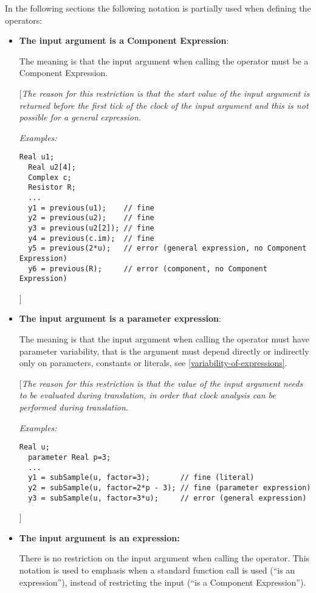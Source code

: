 In the following sections the following notation is partially used when
defining the operators:

\begin{itemize}
\item
  \textbf{The input argument is a Component Expression}:
  
  The meaning is that the input argument when calling the operator must
  be a Component Expression.
  
  {[}\emph{The reason for this restriction is that the start value of
  the input argument is returned before the first tick of the clock of
  the input argument and this is not possible for a general
  expression.}
  
  \emph{Examples:}
\begin{lstlisting}[language=modelica]
  Real u1;
  Real u2[4];
  Complex c;
  Resistor R;
  ...
  y1 = previous(u1);    // fine
  y2 = previous(u2);    // fine
  y3 = previous(u2[2]); // fine
  y4 = previous(c.im);  // fine
  y5 = previous(2*u);   // error (general expression, no Component Expression)
  y6 = previous(R);     // error (component, no Component Expression)
\end{lstlisting}
{]}
\item
  \textbf{The input argument is a parameter expression}:
  
  The meaning is that the input argument when calling the operator must
  have parameter variability, that is the argument must depend directly
  or indirectly only on parameters, constants or literals, see 
  \autoref{variability-of-expressions}.
  
  {[}\emph{The reason for this restriction is that the value of the
  input argument needs to be evaluated during translation, in order that
  clock analysis can be performed during translation.}

  \emph{Examples:}
\begin{lstlisting}[language=modelica]
  Real u;
  parameter Real p=3;
  ...
  y1 = subSample(u, factor=3);       // fine (literal)
  y2 = subSample(u, factor=2*p - 3); // fine (parameter expression)
  y3 = subSample(u, factor=3*u);     // error (general expression)
\end{lstlisting}
{]}
\item
  \textbf{The input argument is an expression:}
  
  There is no restriction on the input argument when calling the
  operator. This notation is used to emphasis when a standard function
  call is used (``is an expression''), instead of restricting the input
  (``is a Component Expression'').
\end{itemize}

